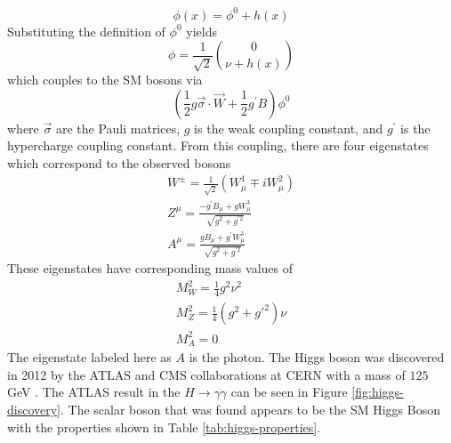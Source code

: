		\begin{equation}\label{eqn:phi-h} \phi(x) = \phi^0 + h(x) \end{equation}
		Substituting the definition of $\phi^0$ yields
		\begin{equation}\label{eqn:phi-h-vec} \phi = \frac{1}{\sqrt{2}} \binom{0}{\nu+h(x)} \end{equation}
		which couples to the \gls{SM} bosons via
		\begin{equation}\label{eqn:coupling} \left(\frac{1}{2} g \vec{\sigma} \cdot \vec{W} + \frac{1}{2} g^\prime B \right) \phi^0  \end{equation} where $\vec{\sigma}$ are the Pauli matrices, $g$ is the weak coupling constant, and $g^{\prime}$ is the hypercharge coupling constant. From this coupling, there are four eigenstates which correspond to the observed bosons
		\begin{equation}\label{eqn:mass-eigenstates} \begin{split}
		W^\pm = \frac{1}{\sqrt{2}} ( W^1_\mu \mp i W^2_\mu ) \\
		Z^\mu = \frac{ - g^\prime B_\mu + g W^3_\mu }{ \sqrt{g^2+g^{\prime 2}} } \\
		A^\mu = \frac{ g B_\mu + g^\prime W^3_\mu }{ \sqrt{g^2+g^{\prime 2}} }
		\end{split}
		\end{equation}
		These eigenstates have corresponding mass values of 
		\begin{equation}\label{eqn:mass-eigenstates-masses} \begin{split}
		M^2_W = \frac{1}{4}g^2\nu^2 \\
		M^2_Z = \frac{1}{4}(g^2+g\prime^2)\nu \\
		M^2_A = 0
		\end{split}
		\end{equation}
		The eigenstate labeled here as $A$ is the photon. The Higgs boson was discovered in 2012 by the \gls{ATLAS} and \gls{CMS} collaborations at \gls{CERN} with a mass of $125$ GeV \cites{higgs-discovery-atlas}{CMS-Higgs-Discovery}. The \gls{ATLAS} result in the $H \to \gamma \gamma$ can be seen in Figure \ref{fig:higgs-discovery}. The scalar boson that was found appears to be the \gls{SM} Higgs Boson with the properties shown in Table \ref{tab:higgs-properties}.

		\begin{table}[!thp]
			\centering
			\caption{The Higgs boson's properties \cite{pdg}.}
			\label{tab:higgs-properties}
		\end{table}

